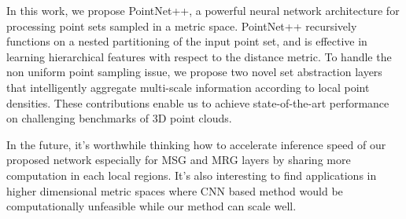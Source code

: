 In this work, we propose PointNet++, a powerful neural network architecture for processing point sets sampled in a metric space. PointNet++ recursively functions on a nested partitioning of the input point set, and is effective in learning hierarchical features with respect to the distance metric. To handle the non uniform point sampling issue, we propose two novel set abstraction layers that intelligently aggregate multi-scale information according to local point densities. These contributions enable us to achieve state-of-the-art performance on challenging benchmarks of 3D point clouds.

In the future, it's worthwhile thinking how to accelerate inference speed of our proposed network especially for MSG and MRG layers by sharing more computation in each local regions. It's also interesting to find applications in higher dimensional metric spaces where CNN based method would be computationally unfeasible while our method can scale well.
